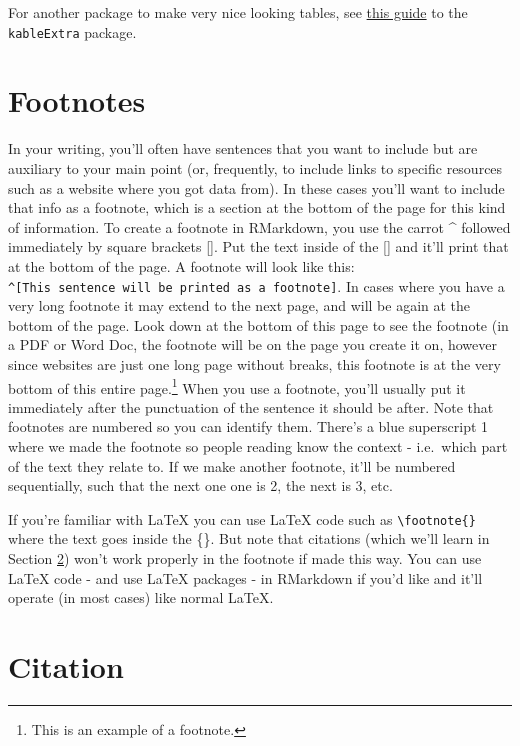 \documentclass[
  12pt,
]{book}
\begin{document}
For another package to make very nice looking tables, see \href{https://cran.r-project.org/web/packages/kableExtra/vignettes/awesome_table_in_html.html}{this guide} to the \texttt{kableExtra} package.

\hypertarget{footnotes}{%
\section{Footnotes}\label{footnotes}}

In your writing, you'll often have sentences that you want to include but are auxiliary to your main point (or, frequently, to include links to specific resources such as a website where you got data from). In these cases you'll want to include that info as a footnote, which is a section at the bottom of the page for this kind of information. To create a footnote in RMarkdown, you use the carrot \^{} followed immediately by square brackets {[}{]}. Put the text inside of the {[}{]} and it'll print that at the bottom of the page. A footnote will look like this: \texttt{\^{}{[}This\ sentence\ will\ be\ printed\ as\ a\ footnote{]}}. In cases where you have a very long footnote it may extend to the next page, and will be again at the bottom of the page. Look down at the bottom of this page to see the footnote (in a PDF or Word Doc, the footnote will be on the page you create it on, however since websites are just one long page without breaks, this footnote is at the very bottom of this entire page.\footnote{This is an example of a footnote.} When you use a footnote, you'll usually put it immediately after the punctuation of the sentence it should be after. Note that footnotes are numbered so you can identify them. There's a blue superscript 1 where we made the footnote so people reading know the context - i.e.~which part of the text they relate to. If we make another footnote, it'll be numbered sequentially, such that the next one one is 2, the next is 3, etc.

If you're familiar with LaTeX you can use LaTeX code such as \texttt{\textbackslash{}footnote\{\}} where the text goes inside the \{\}. But note that citations (which we'll learn in Section \ref{citation}) won't work properly in the footnote if made this way. You can use LaTeX code - and use LaTeX packages - in RMarkdown if you'd like and it'll operate (in most cases) like normal LaTeX.

\hypertarget{citation}{%
\section{Citation}\label{citation}}
\end{document}
